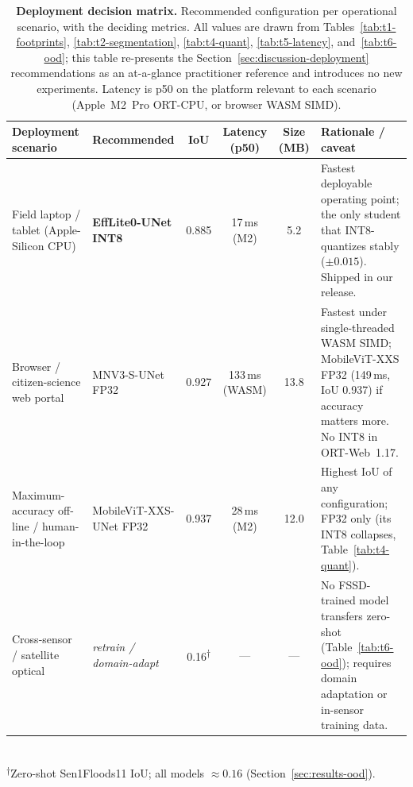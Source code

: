 \begin{table}[ht]
\centering
\caption{\textbf{Deployment decision matrix.} Recommended configuration per operational scenario, with the deciding metrics. All values are drawn from Tables~\ref{tab:t1-footprints}, \ref{tab:t2-segmentation}, \ref{tab:t4-quant}, \ref{tab:t5-latency}, and~\ref{tab:t6-ood}; this table re-presents the Section~\ref{sec:discussion-deployment} recommendations as an at-a-glance practitioner reference and introduces no new experiments. Latency is p50 on the platform relevant to each scenario (Apple~M2~Pro ORT-CPU, or browser WASM SIMD).}
\label{tab:t7-decision}
\small
\setlength{\tabcolsep}{4pt}
\begin{tabular}{p{2.9cm}lcccp{4.5cm}}
\toprule
\textbf{Deployment scenario} & \textbf{Recommended} & \textbf{IoU} & \textbf{Latency (p50)} & \textbf{Size (MB)} & \textbf{Rationale / caveat} \\
\midrule
Field laptop / tablet (Apple-Silicon CPU)
  & \textbf{EffLite0-UNet INT8} & 0.885 & 17\,ms (M2) & 5.2
  & Fastest deployable operating point; the only student that INT8-quantizes stably ($\pm 0.015$). Shipped in our release. \\
\addlinespace
Browser / citizen-science web portal
  & MNV3-S-UNet FP32 & 0.927 & 133\,ms (WASM) & 13.8
  & Fastest under single-threaded WASM SIMD; MobileViT-XXS FP32 (149\,ms, IoU 0.937) if accuracy matters more. No INT8 in ORT-Web~1.17. \\
\addlinespace
Maximum-accuracy off-line / human-in-the-loop
  & MobileViT-XXS-UNet FP32 & 0.937 & 28\,ms (M2) & 12.0
  & Highest IoU of any configuration; FP32 only (its INT8 collapses, Table~\ref{tab:t4-quant}). \\
\addlinespace
Cross-sensor / satellite optical
  & \emph{retrain / domain-adapt} & 0.16\textsuperscript{$\dagger$} & --- & ---
  & No FSSD-trained model transfers zero-shot (Table~\ref{tab:t6-ood}); requires domain adaptation or in-sensor training data. \\
\bottomrule
\end{tabular}
\\[3pt]
{\footnotesize \textsuperscript{$\dagger$}Zero-shot Sen1Floods11 IoU; all models $\approx 0.16$ (Section~\ref{sec:results-ood}).}
\end{table}
